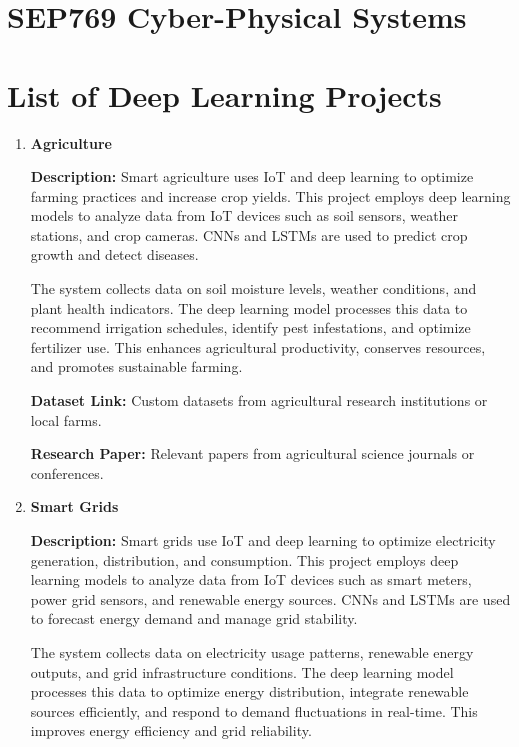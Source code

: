 \documentclass{article}
\begin{document}
\section*{\center\huge{SEP769 Cyber-Physical Systems}}
\section*{\center\Large{List of Deep Learning Projects}}


\begin{enumerate}[label=\textbf{\arabic*.}, leftmargin=*]

\item \textbf{Agriculture}

\textbf{Description:}
Smart agriculture uses IoT and deep learning to optimize farming practices and increase crop yields. This project employs deep learning models to analyze data from IoT devices such as soil sensors, weather stations, and crop cameras. CNNs and LSTMs are used to predict crop growth and detect diseases.

The system collects data on soil moisture levels, weather conditions, and plant health indicators. The deep learning model processes this data to recommend irrigation schedules, identify pest infestations, and optimize fertilizer use. This enhances agricultural productivity, conserves resources, and promotes sustainable farming.

\textbf{Dataset Link:} Custom datasets from agricultural research institutions or local farms.

\textbf{Research Paper:} Relevant papers from agricultural science journals or conferences.

\item \textbf{Smart Grids}

\textbf{Description:}
Smart grids use IoT and deep learning to optimize electricity generation, distribution, and consumption. This project employs deep learning models to analyze data from IoT devices such as smart meters, power grid sensors, and renewable energy sources. CNNs and LSTMs are used to forecast energy demand and manage grid stability.

The system collects data on electricity usage patterns, renewable energy outputs, and grid infrastructure conditions. The deep learning model processes this data to optimize energy distribution, integrate renewable sources efficiently, and respond to demand fluctuations in real-time. This improves energy efficiency and grid reliability.


\end{enumerate}
\end{document}
